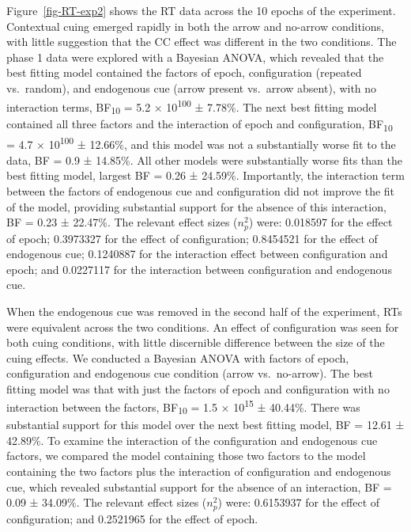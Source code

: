 \documentclass[
  man,
  floatsintext,
  longtable,
  nolmodern,
  notxfonts,
  notimes,
  colorlinks=true,linkcolor=blue,citecolor=blue,urlcolor=blue]{apa7}
\begin{document}
Figure~\ref{fig-RT-exp2} shows the RT data across the 10 epochs of the
experiment. Contextual cuing emerged rapidly in both the arrow and
no-arrow conditions, with little suggestion that the CC effect was
different in the two conditions. The phase 1 data were explored with a
Bayesian ANOVA, which revealed that the best fitting model contained the
factors of epoch, configuration (repeated vs.~random), and endogenous
cue (arrow present vs.~arrow absent), with no interaction terms,
BF\textsubscript{10} = 5.2 × 10\textsuperscript{100} ± 7.78\%. The next
best fitting model contained all three factors and the interaction of
epoch and configuration, BF\textsubscript{10} = 4.7 ×
10\textsuperscript{100} ± 12.66\%, and this model was not a
substantially worse fit to the data, BF = 0.9 ± 14.85\%. All other
models were substantially worse fits than the best fitting model,
largest BF = 0.26 ± 24.59\%. Importantly, the interaction term between
the factors of endogenous cue and configuration did not improve the fit
of the model, providing substantial support for the absence of this
interaction, BF = 0.23 ± 22.47\%. The relevant effect sizes (\(n^2_p\))
were: 0.018597 for the effect of epoch; 0.3973327 for the effect of
configuration; 0.8454521 for the effect of endogenous cue; 0.1240887 for
the interaction effect between configuration and epoch; and 0.0227117
for the interaction between configuration and endogenous cue.

When the endogenous cue was removed in the second half of the
experiment, RTs were equivalent across the two conditions. An effect of
configuration was seen for both cuing conditions, with little
discernible difference between the size of the cuing effects. We
conducted a Bayesian ANOVA with factors of epoch, configuration and
endogenous cue condition (arrow vs.~no-arrow). The best fitting model
was that with just the factors of epoch and configuration with no
interaction between the factors, BF\textsubscript{10} = 1.5 ×
10\textsuperscript{15} ± 40.44\%. There was substantial support for this
model over the next best fitting model, BF = 12.61 ± 42.89\%. To examine
the interaction of the configuration and endogenous cue factors, we
compared the model containing those two factors to the model containing
the two factors plus the interaction of configuration and endogenous
cue, which revealed substantial support for the absence of an
interaction, BF = 0.09 ± 34.09\%. The relevant effect sizes (\(n^2_p\))
were: 0.6153937 for the effect of configuration; and 0.2521965 for the
effect of epoch.
\end{document}
